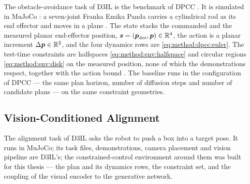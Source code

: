 The obstacle-avoidance task of D3IL \parencite{jia2024towards} is the benchmark of \ac{DPCC}
\parencite[Sec.~6.1]{romer2025diffusion}. It is simulated in MuJoCo
\parencite{todorov2012mujoco}: a seven-joint Franka Emika Panda carries a cylindrical rod as its end
effector and moves in a plane \parencite[Sec.~3.3]{jia2024towards}. The state stacks the commanded and the measured planar
end-effector position, $\boldsymbol{s} = (\boldsymbol{p}_{\textrm{des}},\boldsymbol{p})\in\mathbb{R}^{4}$, the action is a planar
increment $\Delta\boldsymbol{p}\in\mathbb{R}^{2}$, and the four dynamics rows are \eqref{eq:method:dpcc:euler}. The
test-time constraints are halfspaces \eqref{eq:method:env:halfspace} and circular regions
\eqref{eq:method:env:disk} on the measured position, none of which the demonstrations respect, together
with the action bound \parencite[Sec.~6.1]{romer2025diffusion}. The baseline runs in the configuration of \ac{DPCC} --- the
same plan horizon, number of diffusion steps and number of candidate plans --- on the
same constraint geometries.

\subsection{Vision-Conditioned Alignment}\label{sec:method:env:aligning}

The alignment task of D3IL \parencite{jia2024towards} asks the robot to push a box into a target
pose. It runs in MuJoCo; its task files, demonstrations, camera placement and vision pipeline are
D3IL's; the constrained-control environment
around them was built for this thesis --- the plan and its dynamics rows, the constraint set, and the
coupling of the visual encoder to the generative network.


